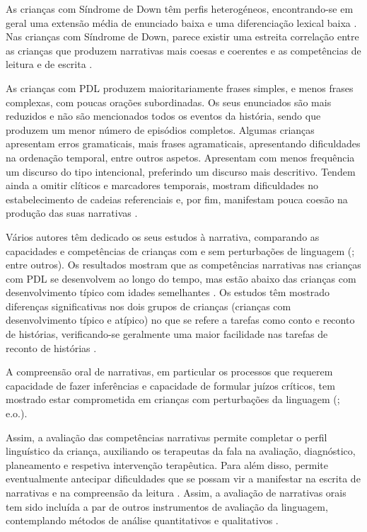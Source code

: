 \documentclass[output=paper,colorlinks,citecolor=brown,booklanguage=portuguese]{langscibook}
\begin{document}
As crianças com Síndrome de Down têm perfis heterogéneos, en\-contrando-se em geral uma extensão média de enunciado baixa e uma diferenciação lexical baixa \citep{Boudreau2000}. Nas crianças com Síndrome de Down, parece existir uma estreita correlação entre as crianças que produzem narrativas mais coesas e coerentes e as competências de leitura e de escrita \citep{Bysterveldt2012}.

As crianças com PDL produzem maioritariamente frases simples, e menos frases complexas, com poucas orações subordinadas. Os seus enunciados são mais reduzidos e não são mencionados todos os eventos da história, sendo que produzem um menor número de episódios completos. Algumas crianças apresentam erros gramaticais, mais frases agramaticais, apresentando dificuldades na ordenação temporal, entre outros aspetos. Apresentam com menos frequência um discurso do tipo intencional, preferindo um discurso mais descritivo. Tendem ainda a omitir clíticos e marcadores temporais, mostram dificuldades no estabelecimento de cadeias referenciais e, por fim, manifestam pouca coesão na produção das suas narrativas \citep{Fey2004, BefiLopes2008}.

Vários autores têm dedicado os seus estudos à narrativa, comparando as capacidades e competências de crianças com e sem perturbações de linguagem (\citealp{Gillam1992, ContiRamsden2003, Kraljevic2020, Favot2020}; entre outros). Os resultados mostram que as competências narrativas nas crianças com PDL se desenvolvem ao longo do tempo, mas estão abaixo das crianças com desenvolvimento típico com idades semelhantes \citep{Reuterskioeld2011, Kraljevic2020, Favot2020}. Os estudos têm mostrado diferenças significativas nos dois grupos de crianças (crianças com desenvolvimento típico e atípico) no que se refere a tarefas como conto e reconto de histórias, verificando-se geralmente uma maior facilidade nas tarefas de reconto de histórias \citep{Kraljevic2020}.

A compreensão oral de narrativas, em particular os processos que requerem capacidade de fazer inferências e capacidade de formular juízos críticos, tem mostrado estar comprometida em crianças com perturbações da linguagem (\citealt{Bishop1992, Gillam2016, Crais1987, Gillam2009, Dawes2017}; e.o.).

Assim, a avaliação das competências narrativas permite completar o perfil linguístico da criança, auxiliando os terapeutas da fala na avaliação, diagnóstico, planeamento e respetiva intervenção terapêutica. Para além disso, permite eventualmente antecipar dificuldades que se possam vir a manifestar na escrita de narrativas e na compreensão da leitura \citep{Catts2015, Pinto2016}. Assim, a avaliação de narrativas orais tem sido incluída a par de outros instrumentos de avaliação da linguagem, contemplando métodos de análise quantitativos e qualitativos \citep{Justice2010, Petersen2008}.
\end{document}
